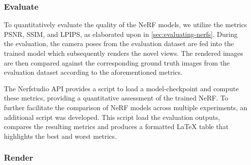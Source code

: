 \begin{comment}
During the training of a NeRF, a batch of pixels is created for each training iteration. By default, this batch consists of 4096 pixels. To obtain these pixels, the training algorithm randomly samples them from all of the training images that are stored in RAM. However, this approach can be memory-intensive, especially when dealing with large datasets. To address this issue, the NeRF pipeline provides an option to set the parameter \texttt{–-pipeline.datamanager.train-num-images-to-sample-from}, which allows the user to sample pixels from a smaller subset of images. When using a smaller subset of images, the training algorithm will keep sampling from this subset unless the parameter \texttt{--num-times-to-repeat-images} is also set. This parameter specifies the number of training iterations after which the training algorithm should grab a new set of images to sample from. For instance, if \texttt{--num-times-to-repeat-images} is set to 1, the training algorithm will grab a new set of images to sample from every iteration. However, this approach can be computationally expensive and slow down the training process.
\end{comment}




\subsubsection{Evaluate}
To quantitatively evaluate the quality of the NeRF models, we utilize the metrics PSNR, SSIM, and LPIPS, as elaborated upon in \autoref{sec:evaluating-nerfs}. During the evaluation, the camera poses from the evaluation dataset are fed into the trained model which subsequently renders the novel views. The rendered images are then compared against the corresponding ground truth images from the evaluation dataset according to the aforementioned metrics. 

The Nerfstudio API provides a script to load a model-checkpoint and compute these metrics, providing a quantitative assessment of the trained NeRF. To further facilitate the comparison of NeRF models across multiple experiments, an additional script was developed. This script load the evaluation outputs, compares the resulting metrics and produces a formatted LaTeX table that highlights the best and worst metrics.

%

\subsubsection{Render}

